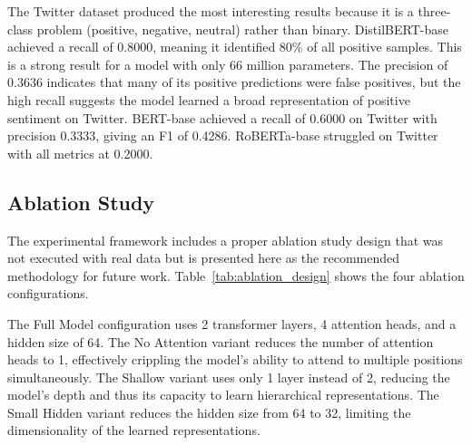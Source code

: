 \documentclass[conference]{IEEEtran}
\begin{document}
The Twitter dataset produced the most interesting results because it is a three-class problem (positive, negative, neutral) rather than binary. DistilBERT-base achieved a recall of 0.8000, meaning it identified 80\% of all positive samples. This is a strong result for a model with only 66 million parameters. The precision of 0.3636 indicates that many of its positive predictions were false positives, but the high recall suggests the model learned a broad representation of positive sentiment on Twitter. BERT-base achieved a recall of 0.6000 on Twitter with precision 0.3333, giving an F1 of 0.4286. RoBERTa-base struggled on Twitter with all metrics at 0.2000.

\subsection{Ablation Study}

The experimental framework includes a proper ablation study design that was not executed with real data but is presented here as the recommended methodology for future work. Table~\ref{tab:ablation_design} shows the four ablation configurations.

\begin{table}[h]
\centering
\caption{Ablation Study Configurations for Model Architecture Analysis}
\label{tab:ablation_design}
\end{table}

The Full Model configuration uses 2 transformer layers, 4 attention heads, and a hidden size of 64. The No Attention variant reduces the number of attention heads to 1, effectively crippling the model's ability to attend to multiple positions simultaneously. The Shallow variant uses only 1 layer instead of 2, reducing the model's depth and thus its capacity to learn hierarchical representations. The Small Hidden variant reduces the hidden size from 64 to 32, limiting the dimensionality of the learned representations.
\end{document}
